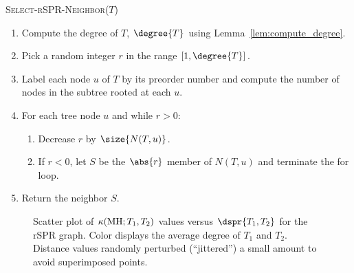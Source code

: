\documentclass[10pt,twoside,leqno,twocolumn]{article}
\let\MYoriglatexcaption\caption
\renewcommand{\caption}[2][\relax]{\MYoriglatexcaption[#2]{#2}}
\newcommand{\MH}{\operatorname{MH}}
\newcommand{\curvature}[2][]{%
    \ifthenelse{\equal{#1}{}}%
		{\kappa(#2)}%
		{\kappa_{#1}(#2)}%
}
\begin{document}
\vspace{1em}
\textsc{Select-rSPR-Neighbor($T$)}
\begin{enumerate}[label={\arabic*}.]
	\item	Compute the degree of $T$, $\degree{T}$ using Lemma~\ref{lem:compute_degree}.
	\item Pick a random integer $r$ in the range $[1,\degree{T}]$.
	\item Label each node $u$ of $T$ by its preorder number and compute the number of nodes in the subtree rooted at each $u$.
\item For each tree node $u$ and while $r > 0$:
	\begin{enumerate}
		\item Decrease $r$ by $\size{N(T,u)}$.
		\item If $r < 0$, let $S$ be the $\abs{r}$ member of $N(T,u)$ and terminate the for loop.
	\end{enumerate}
\item Return the neighbor $S$.
\end{enumerate}

\begin{figure}
    \caption{Scatter plot of $\curvature{\MH; T_1,T_2}$ values versus $\dspr{T_1,T_2}$ for the rSPR graph. Color displays the average degree of $T_1$ and $T_2$. Distance values randomly perturbed (``jittered'') a small amount to avoid superimposed points.}
	\label{fig:rspr-scatter}
\end{figure}
\end{document}
